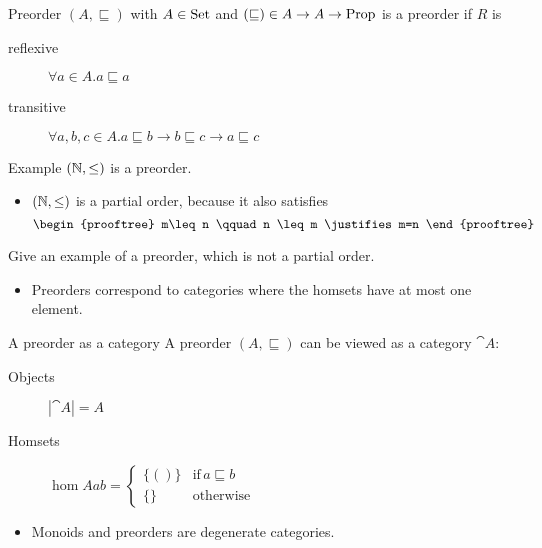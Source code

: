 \documentclass[handout]{beamer}
\newcommand{\ru}[2]{\vspace{1ex}
\begin{prooftree}
#1 \justifies #2
\end{prooftree}\vspace{1ex}}
\begin{document}
\begin{frame}

  \begin{block}{Preorder}
    $(A,\sqsubseteq)$ with $A\in\mathrm{Set}$ and $(\sqsubseteq)\in A\to A\to\mathrm{Prop}$ is a preorder 
    if $R$ is
    \begin{description}
    \item[reflexive] $\forall a\in A.a \sqsubseteq a$
    \item[transitive] $\forall a,b,c\in A.a \sqsubseteq b \to b
      \sqsubseteq c \to a \sqsubseteq c$
    \end{description}
  \end{block}

  \pause
  \begin{block}{Example}
    $(\mathbb{N},\leq)$ is a preorder.
  \end{block}

  \pause
  \begin{itemize}
  \item $(\mathbb{N},\leq)$ is a partial order, because it also satisfies
    \[ \ru{m\leq n \qquad n \leq m}{m=n} \]
  \end{itemize}

  \pause
  \begin{question}
    Give an example of a preorder, which is not a partial order.
  \end{question}

\end{frame}

\begin{frame}
  \begin{itemize}
  \item Preorders correspond to categories where the homsets have at most one element.
  \end{itemize}
  
  \pause
  \begin{block}{A preorder as a category}
    A preorder $(A,\sqsubseteq)$ can be viewed as a category $\cat{A}$:
    \begin{description}
    \item[Objects] $|\cat{A}| = A$

    \item[Homsets] $\hom{A}{a}{b} = 
      \left\{ \begin{array}{ll}
          \{()\} & \mbox{if}\,a\sqsubseteq b \\
          \{\} & \mbox{otherwise} \end{array} \right.$
    
    \end{description}
  \end{block}

  \pause
  \begin{itemize}
  \item Monoids and preorders are degenerate categories.
  \end{itemize}

\end{frame}
\end{document}
